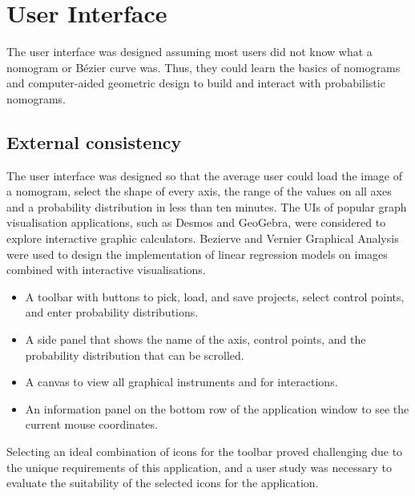 \documentclass{l4proj}
\begin{document}
\section{User Interface}

The user interface was designed assuming most users did not know what a nomogram or Bézier curve was. Thus, they could learn the basics of nomograms and computer-aided geometric design to build and interact with probabilistic nomograms. 
\subsection{External consistency}

The user interface was designed so that the average user could load the image of a nomogram, select the shape of every axis, the range of the values on all axes and a probability distribution in less than ten minutes. The UIs of popular graph visualisation applications, such as Desmos and GeoGebra, were considered to explore interactive graphic calculators. Bezierve and Vernier Graphical Analysis were used to design the implementation of linear regression models on images combined with interactive visualisations. 
\begin{itemize}
    \item A toolbar with buttons to pick, load, and save projects, select control points, and enter probability distributions. 
    \item A side panel that shows the name of the axis, control points, and the probability distribution that can be scrolled.
    \item A canvas to view all graphical instruments and for interactions.
    \item An information panel on the bottom row of the application window to see the current mouse coordinates. 
\end{itemize}
 Selecting an ideal combination of icons for the toolbar proved challenging due to the unique requirements of this application, and a user study was necessary to evaluate the suitability of the selected icons for the application. 
\end{document}
